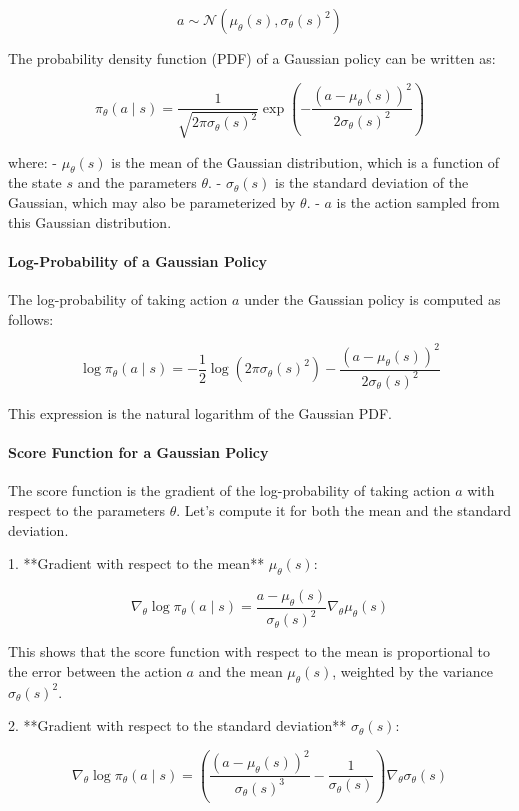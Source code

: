 \documentclass[10pt, oneside]{article}
\theoremstyle{definition}
\begin{document}
\[
a \sim \mathcal{N}(\mu_\theta(s), \sigma_\theta(s)^2)
\]

The probability density function (PDF) of a Gaussian policy can be written as:

\[
\pi_\theta(a \mid s) = \frac{1}{\sqrt{2 \pi \sigma_\theta(s)^2}} \exp\left( -\frac{(a - \mu_\theta(s))^2}{2 \sigma_\theta(s)^2} \right)
\]

where:
- $\mu_\theta(s)$ is the mean of the Gaussian distribution, which is a function of the state $s$ and the parameters $\theta$.
- $\sigma_\theta(s)$ is the standard deviation of the Gaussian, which may also be parameterized by $\theta$.
- $a$ is the action sampled from this Gaussian distribution.

\paragraph{Log-Probability of a Gaussian Policy}

The log-probability of taking action $a$ under the Gaussian policy is computed as follows:

\[
\log \pi_\theta(a \mid s) = -\frac{1}{2} \log(2 \pi \sigma_\theta(s)^2) - \frac{(a - \mu_\theta(s))^2}{2 \sigma_\theta(s)^2}
\]

This expression is the natural logarithm of the Gaussian PDF.

\paragraph{Score Function for a Gaussian Policy}

The score function is the gradient of the log-probability of taking action $a$ with respect to the parameters $\theta$. Let's compute it for both the mean and the standard deviation.

1. **Gradient with respect to the mean** $\mu_\theta(s)$:
   
\[
\nabla_\theta \log \pi_\theta(a \mid s) = \frac{a - \mu_\theta(s)}{\sigma_\theta(s)^2} \nabla_\theta \mu_\theta(s)
\]

This shows that the score function with respect to the mean is proportional to the error between the action $a$ and the mean $\mu_\theta(s)$, weighted by the variance $\sigma_\theta(s)^2$.

2. **Gradient with respect to the standard deviation** $\sigma_\theta(s)$:
   
\[
\nabla_\theta \log \pi_\theta(a \mid s) = \left( \frac{(a - \mu_\theta(s))^2}{\sigma_\theta(s)^3} - \frac{1}{\sigma_\theta(s)} \right) \nabla_\theta \sigma_\theta(s)
\]
\end{document}
